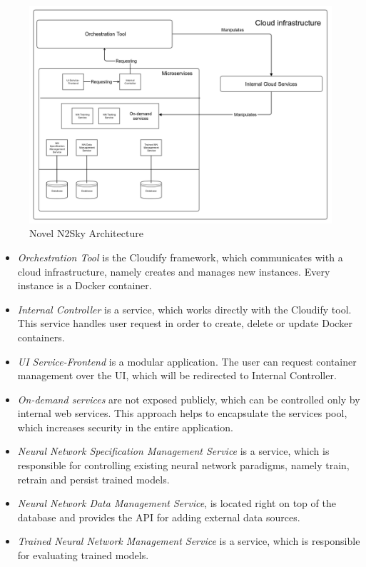 \begin{figure}[H]
\begin{center}
  \includegraphics[width=\linewidth]{components/2/architecture.png}
  \caption{Novel N2Sky Architecture}
  \label{fig:newarch}
\end{center}
\end{figure}

\begin{itemize}
\item \emph{Orchestration Tool} is the Cloudify framework, which communicates with a cloud infrastructure, namely creates and manages new instances. Every instance is a Docker container.
\item \emph{Internal Controller} is a service, which works directly with the Cloudify tool. This service handles user request in order to create, delete or update Docker containers.
\item \emph{UI Service-Frontend} is a modular application. The user can request container management over the UI, which will be redirected to Internal Controller.
\item \emph{On-demand services} are not exposed publicly, which can be controlled only by internal web services.  This approach helps to encapsulate the services pool, which increases security in the entire application. 
\item \emph{Neural Network Specification Management Service}  is a service, which is responsible for controlling existing neural network paradigms, namely train, retrain and persist trained models.
\item \emph{Neural Network Data Management Service}, is located right on top of the database and provides the API for adding external data sources.
\item \emph{Trained Neural Network Management Service} is a service, which is responsible for evaluating trained models.
\end{itemize}


